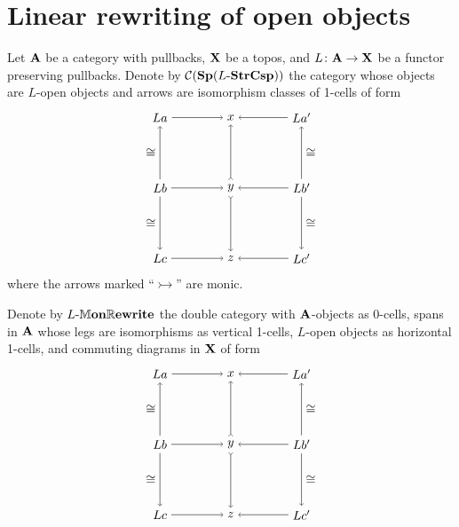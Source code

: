 \documentclass{amsart}
\begin{document}
\section{Linear rewriting of open objects}


\begin{df} \label{df_arrow-category-monic-rewrite}
	Let $ \mathbf{A} $ be a category with pullbacks, $ \mathbf{X} $ be a topos, and $ L \colon \mathbf{A} \to \mathbf{X} $ be a functor preserving pullbacks.  Denote by $ \mathcal{C}(\mathbf{Sp}(L \text{-} \mathbf{StrCsp})) $ the category whose objects are $ L $-open objects and arrows are isomorphism classes of 1-cells of form
	\[
	\begin{tikzpicture}
	\node (a) at (-1,1) {$ L a $};
	\node (x) at (1,1) {$ x $};
	\node (a') at (3,1) {$ L a' $};
	\node (b) at (-1,-1) {$ L b $};
	\node (y) at (1,-1) {$ y $};
	\node (b') at (3,-1) {$ L b' $};
	\node (c) at (-1,-3) {$ L c $};
	\node (z) at (1,-3) {$ z $};
	\node (c') at (3,-3) {$ L c' $};
	\draw [->] (a) to (x);
	\draw [->] (a') to (x);
	\draw [->] (b) to (y);
	\draw [->] (b') to (y);
	\draw [->] (c) to (z);
	\draw [->] (c') to (z);
	\draw [->] (b) to node [left] {$ \cong $} (a);
	\draw [->] (b) to node [left] {$ \cong $} (c);
	\draw [>->] (y) to (x);
	\draw [>->] (y) to (z);
	\draw [->] (b') to node [right] {$ \cong $} (a');
	\draw [->] (b') to node [right] {$ \cong $} (c');
	\end{tikzpicture}
	\]
	where the arrows marked ``$ \rightarrowtail $'' are monic. 
\end{df}

\begin{df} \label{df_mon-rewrite-dble-cat}
	Denote by $ L \text{-} \mathbb{M}\mathbf{on}\mathbb{R}\mathbf{ewrite} $ the double category with $ \mathbf{A} $-objects as 0-cells, spans in $ \mathbf{A} $ whose legs are isomorphisms as vertical 1-cells, $ L $-open objects as horizontal 1-cells, and commuting diagrams in $ \mathbf{X} $ of form	
	\[
	\begin{tikzpicture}
	\node (a) at (-1,1) {$ L a $};
	\node (x) at (1,1) {$ x $};
	\node (a') at (3,1) {$ L a' $};
	\node (b) at (-1,-1) {$ L b $};
	\node (y) at (1,-1) {$ y $};
	\node (b') at (3,-1) {$ L b' $};
	\node (c) at (-1,-3) {$ L c $};
	\node (z) at (1,-3) {$ z $};
	\node (c') at (3,-3) {$ L c' $};
	\draw [->] (a) to (x);
	\draw [->] (a') to (x);
	\draw [->] (b) to (y);
	\draw [->] (b') to (y);
	\draw [->] (c) to (z);
	\draw [->] (c') to (z);
	\draw [->] (b) to node [left] {$ \cong $} (a);
	\draw [->] (b) to node [left] {$ \cong $} (c);
	\draw [>->] (y) to (x);
	\draw [>->] (y) to (z);
	\draw [->] (b') to node [right] {$ \cong $} (a');
	\draw [->] (b') to node [right] {$ \cong $} (c');
	\end{tikzpicture}
	\]
\end{df}
\end{document}
